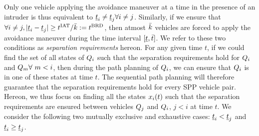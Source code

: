 Only one vehicle applying the avoidance maneuver at a time in the presence of an intruder is thus equivalent to $\underline{t}_i \neq \underline{t}_j \forall i \neq j$. Similarly, if we ensure that $\forall i \neq j, |\underline{t}_i - \underline{t}_j| \geq t^\text{IAT} / \bar{k}  := t^\text{BRD}$, then atmost $\bar{k}$ vehicles are forced to apply the avoidance maneuver during the time interval $[\underline{t}, \bar{t}]$. We refer to these two conditions as \textit{separation requirements} hereon. For any given time $t$, if we could find the set of all states of $Q_i$ such that the separation requirements hold for $Q_i$ and $Q_m \forall ~ m<i$, then during the path planning of $Q_i$, we can ensure that $Q_i$ is in one of these states at time $t$. The sequential path planning will therefore guarantee that the separation requirements hold for every SPP vehicle pair. Hereon, we thus focus on finding all the states $x_i(t)$ such that the separation requirements are ensured between vehicles $Q_j$ and $Q_i$, $j <i$ at time $t$. We consider the following two mutually exclusive and exhaustive cases: $\underline{t}_i < \underline{t}_j$ and $\underline{t}_i \geq \underline{t}_j$. %